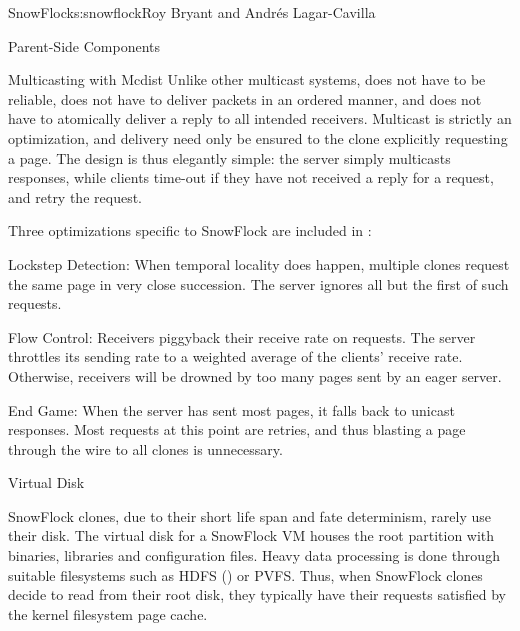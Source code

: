 \begin{aosachapter}{SnowFlock}{s:snowflock}{Roy Bryant and Andr\'e{s} Lagar-Cavilla}
\begin{aosasect1}{Parent-Side Components}
\begin{aosasect2}{Multicasting with Mcdist}
Unlike other multicast systems,  does not have to be reliable,
does not have to deliver packets in an ordered manner, and does not
have to atomically deliver a reply to all intended
receivers. Multicast is strictly an optimization, and delivery need
only be ensured to the clone explicitly requesting a page. The design
is thus elegantly simple: the server simply multicasts responses,
while clients time-out if they have not received a reply for a
request, and retry the request.

Three optimizations specific to SnowFlock are included in :

\begin{aosaitemize}

  \item Lockstep Detection: When temporal locality does happen,
  multiple clones request the same page in very close
  succession. The  server ignores all but the first of such
  requests.

  \item Flow Control: Receivers piggyback their receive rate on
  requests.  The server throttles its sending rate to a weighted
  average of the clients' receive rate. Otherwise, receivers will be
  drowned by too many pages sent by an eager server.

  \item End Game: When the server has sent most pages, it falls back
    to unicast responses. Most requests at this point are retries, and
    thus blasting a page through the wire to all clones is
    unnecessary.

\end{aosaitemize}

\end{aosasect2}

\begin{aosasect2}{Virtual Disk}

SnowFlock clones, due to their short life span and fate determinism,
rarely use their disk. The virtual disk for a SnowFlock VM houses the
root partition with binaries, libraries and configuration files. Heavy
data processing is done through suitable filesystems such as HDFS
() or PVFS\@. Thus, when SnowFlock clones decide
to read from their root disk, they typically have their requests
satisfied by the kernel filesystem page cache.


\end{aosasect2}
\end{aosasect1}
\end{aosachapter}
